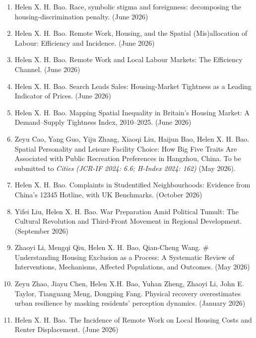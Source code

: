 \documentclass[10pt,a4paper]{article}
\begin{document}
\begin{enumerate}
\item
  Helen X. H. Bao. Race, symbolic stigma and foreignness: decomposing
  the housing-discrimination penalty. (June 2026)
\item
  Helen X. H. Bao. Remote Work, Housing, and the Spatial (Mis)allocation
  of Labour: Efficiency and Incidence. (June 2026)
\item
  Helen X. H. Bao. Remote Work and Local Labour Markets: The Efficiency
  Channel. (June 2026)
\item
  Helen X. H. Bao. Search Leads Sales: Housing-Market Tightness as a
  Leading Indicator of Prices. (June 2026)
\item
  Helen X. H. Bao. Mapping Spatial Inequality in Britain's Housing
  Market: A Demand--Supply Tightness Index, 2010--2025. (June 2026)
\item
  Zeyu Cao, Yang Guo, Yiju Zhang, Xiaoqi Liu, Haijun Bao, Helen X. H.
  Bao. Spatial Personality and Leisure Facility Choice: How Big Five
  Traits Are Associated with Public Recreation Preferences in Hangzhou,
  China. To be submitted to \emph{Cities} \emph{(JCR-IF 2024: 6.6;
  H-Index 2024: 162)} (May 2026).
\item
  Helen X. H. Bao. Complaints in Studentified Neighbourhoods: Evidence
  from China's 12345 Hotline, with UK Benchmarks. (October 2026)
\item
  Yifei Liu, Helen X. H. Bao. War Preparation Amid Political Tumult: The
  Cultural Revolution and Third-Front Movement in Regional Development.
  (September 2026)
\item
  Zhaoyi Li, Mengqi Qiu, Helen X. H. Bao, Qian-Cheng Wang. \#
  Understanding Housing Exclusion as a Process: A Systematic Review of
  Interventions, Mechanisms, Affected Populations, and Outcomes. (May
  2026)
\item
  Zeyu Zhao, Jiayu Chen, Helen X.H. Bao, Yuhan Zheng, Zhaoyi Li, John E.
  Taylor, Tianguang Meng, Dongping Fang. Physical recovery overestimates
  urban resilience by masking residents' perception dynamics. (January
  2026)
\item
  Helen X. H. Bao. The Incidence of Remote Work on Local Housing Costs
  and Renter Displacement. (June 2026)
\end{enumerate}
\end{document}
